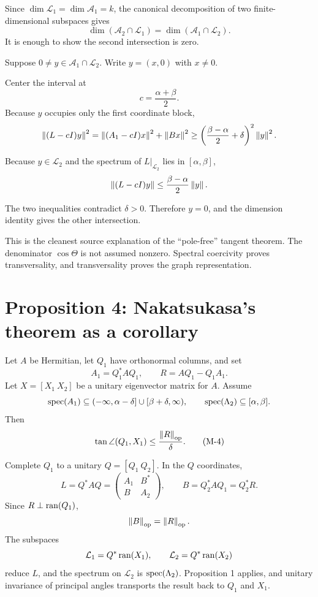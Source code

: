 \begin{proofoutline}
\item Since $\dim\mathcal L_1=\dim\mathcal A_1=k$, the canonical decomposition of two finite-dimensional subspaces gives
\[
  \dim(\mathcal A_2\cap\mathcal L_1)
  =\dim(\mathcal A_1\cap\mathcal L_2).
\]
It is enough to show the second intersection is zero.
\item Suppose $0\ne y\in\mathcal A_1\cap\mathcal L_2$. Write $y=(x,0)$ with $x\ne0$.
\item Center the interval at
\[
  c=\frac{\alpha+\beta}{2}.
\]
Because $y$ occupies only the first coordinate block,
\[
  \left\lVert (L-cI)y\right\rVert^2
  =\left\lVert (A_1-cI)x\right\rVert^2+\left\lVert Bx\right\rVert^2
  \ge\left(\frac{\beta-\alpha}{2}+\delta\right)^2\left\lVert y\right\rVert^2.
\]
\item Because $y\in\mathcal L_2$ and the spectrum of $L|_{\mathcal L_2}$ lies in $[\alpha,\beta]$,
\[
  \left\lVert (L-cI)y\right\rVert
  \le\frac{\beta-\alpha}{2}\left\lVert y\right\rVert.
\]
\item The two inequalities contradict $\delta>0$. Therefore $y=0$, and the dimension identity gives the other intersection.
\end{proofoutline}

This is the cleanest source explanation of the ``pole-free'' tangent theorem. The denominator $\cos\Theta$ is not assumed nonzero. Spectral coercivity proves transversality, and transversality proves the graph representation.

\section{Proposition 4: Nakatsukasa's theorem as a corollary}


Let $A$ be Hermitian, let $Q_1$ have orthonormal columns, and set
\[
  A_1=Q_1^*AQ_1,
  \qquad
  R=AQ_1-Q_1A_1.
\]
Let $X=[X_1\ X_2]$ be a unitary eigenvector matrix for $A$. Assume
\[
  \operatorname{spec}(A_1)
  \subseteq(-\infty,\alpha-\delta]
      \cup[\beta+\delta,\infty),
  \qquad
  \operatorname{spec}(\Lambda_2)\subseteq[\alpha,\beta].
\]
Then
\begin{equation}
  \tan\angle(Q_1,X_1)
  \le\frac{\left\lVert R\right\rVert_{\mathrm{op}}}{\delta}.
  \tag{M-4}
\end{equation}

Complete $Q_1$ to a unitary $Q=[Q_1\ Q_2]$. In the $Q$ coordinates,
\[
  L=Q^*AQ
  =\begin{pmatrix}
      A_1&B^*\\B&A_2
    \end{pmatrix},
  \qquad
  B=Q_2^*AQ_1=Q_2^*R.
\]
Since $R\perp\operatorname{ran}(Q_1)$,
\[
  \left\lVert B\right\rVert_{\mathrm{op}}=\left\lVert R\right\rVert_{\mathrm{op}}.
\]
The subspaces
\[
  \mathcal L_1=Q^*\operatorname{ran}(X_1),
  \qquad
  \mathcal L_2=Q^*\operatorname{ran}(X_2)
\]
reduce $L$, and the spectrum on $\mathcal L_2$ is $\operatorname{spec}(\Lambda_2)$. Proposition 1 applies, and unitary invariance of principal angles transports the result back to $Q_1$ and $X_1$.

